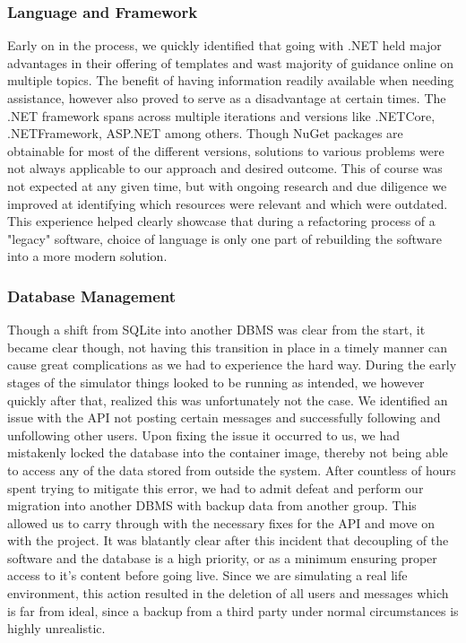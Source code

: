 \documentclass{article}
\begin{document}
    \subsubsection{Language and Framework}
    Early on in the process, we quickly identified that going with .NET held major advantages in their offering of templates and wast majority of guidance online on multiple topics. The benefit of having information readily available when needing assistance, however also proved to serve as a disadvantage at certain times. The .NET framework spans across multiple iterations and versions  like .NETCore, .NETFramework, ASP.NET among others. Though NuGet packages are obtainable for most of the different versions, solutions to various problems were not always applicable to our approach and desired outcome. This of course was not expected at any given time, but with ongoing research and due diligence we improved at identifying which resources were relevant and which were outdated. This experience helped clearly showcase that during a refactoring process of a "legacy" software, choice of language is only one part of rebuilding the software into a more modern solution.

    \subsubsection{Database Management}
    Though a shift from SQLite into another DBMS was clear from the start, it became clear though, not having this transition in place in a timely manner can cause great complications as we had to experience the hard way.
    During the early stages of the simulator things looked to be running as intended, we however quickly after that, realized this was unfortunately not the case. We identified an issue with the API not posting certain messages and successfully following and unfollowing other users. Upon fixing the issue it occurred to us, we had mistakenly locked the database into the container image, thereby not being able to access any of the data stored from outside the system. After countless of hours spent trying to mitigate this error, we had to admit defeat and perform our migration into another DBMS with backup data from another group. This allowed us to carry through with the necessary fixes for the API and move on with the project. It was blatantly clear after this incident that decoupling of the software and the database is a high priority, or as a minimum ensuring proper access to it's content before going live. Since we are simulating a real life environment, this action resulted in the deletion of all users and messages which is far from ideal, since a backup from a third party under normal circumstances is highly unrealistic.
\end{document}
